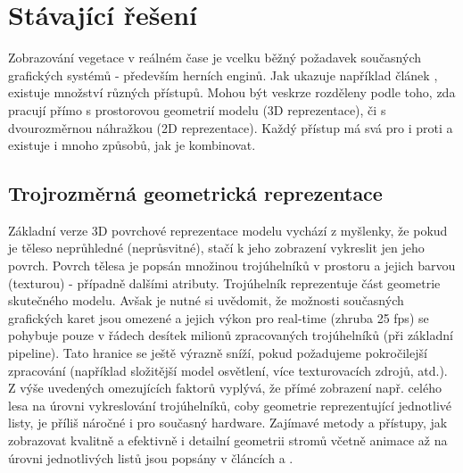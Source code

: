 \section{Stávající řešení}

Zobrazování vegetace v reálném čase je vcelku běžný požadavek současných grafických systémů - především herních enginů. Jak ukazuje například článek \cite{Mantler_2003_SARRV}, existuje množství různých přístupů. Mohou být veskrze rozděleny podle toho, zda pracují přímo s prostorovou geometrií modelu (3D reprezentace), či s dvourozměrnou náhražkou (2D reprezentace). Každý přístup má svá pro i proti a existuje i mnoho způsobů, jak je kombinovat.
 
\subsection{Trojrozměrná geometrická reprezentace}
Základní verze 3D povrchové reprezentace modelu vychází z myšlenky, že pokud je těleso neprůhledné (neprůsvitné), stačí k jeho zobrazení vykreslit jen jeho povrch. Povrch tělesa je popsán množinou trojúhelníků v prostoru a jejich barvou (texturou) - případně dalšími atributy. Trojúhelník reprezentuje část geometrie skutečného modelu. Avšak je nutné si uvědomit, že možnosti současných grafických karet jsou omezené a jejich výkon pro real-time (zhruba 25 fps) se pohybuje pouze v řádech desítek milionů zpracovaných trojúhelníků  (při základní pipeline). Tato hranice se ještě výrazně sníží, pokud požadujeme pokročilejší zpracování (například složitější model osvětlení, více texturovacích zdrojů, atd.). Z výše uvedených omezujících faktorů vyplývá, že přímé zobrazení např. celého lesa na úrovni vykreslování trojúhelníků, coby geometrie reprezentující jednotlivé listy, je příliš náročné i pro současný hardware.
Zajímavé metody a přístupy, jak zobrazovat kvalitně a efektivně i detailní geometrii stromů včetně animace až na úrovni jednotlivých listů jsou popsány v článcích \cite{Habel_09_PGT} a \cite{Habel_2007_RTT}. 

